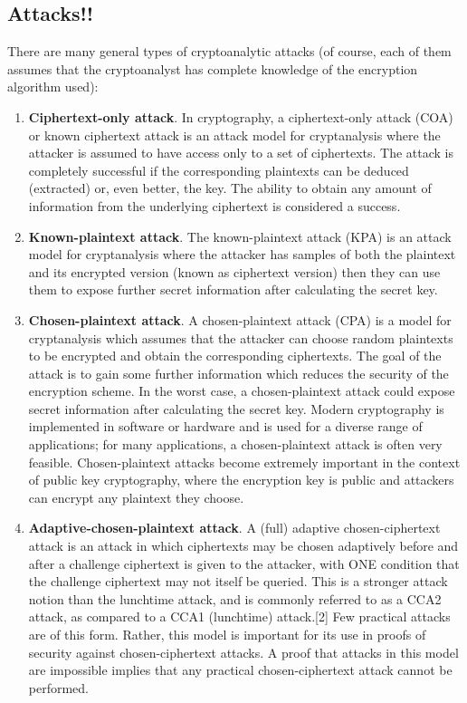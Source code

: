 \documentclass{article}
\begin{document}
\subsection{Attacks!!}
There are many general types of cryptoanalytic attacks (of course, each of them assumes that the cryptoanalyst has complete knowledge of the encryption algorithm used):
\begin{enumerate}
    \item \textbf{Ciphertext-only attack}. In cryptography, a ciphertext-only attack (COA) or known ciphertext attack is an attack model for cryptanalysis where the attacker is assumed to have access only to a set of ciphertexts.
    The attack is completely successful if the corresponding plaintexts can be deduced (extracted) or, even better, the key. The ability to obtain any amount of information from the underlying ciphertext is considered a success.
    \item \textbf{Known-plaintext attack}. The known-plaintext attack (KPA) is an attack model for cryptanalysis where the attacker has samples of both the plaintext and its encrypted version (known as ciphertext version) then they can use them to expose further secret information after calculating the secret key.
    \item \textbf{Chosen-plaintext attack}. A chosen-plaintext attack (CPA) is a model for cryptanalysis which assumes that the attacker can choose random plaintexts to be encrypted and obtain the corresponding ciphertexts. The goal of the attack is to gain some further information which reduces the security of the encryption scheme. In the worst case, a chosen-plaintext attack could expose secret information after calculating the secret key.
    Modern cryptography is implemented in software or hardware and is used for a diverse range of applications; for many applications, a chosen-plaintext attack is often very feasible. Chosen-plaintext attacks become extremely important in the context of public key cryptography, where the encryption key is public and attackers can encrypt any plaintext they choose.
    \item \textbf{Adaptive-chosen-plaintext attack}. A (full) adaptive chosen-ciphertext attack is an attack in which ciphertexts may be chosen adaptively before and after a challenge ciphertext is given to the attacker, with ONE condition that the challenge ciphertext may not itself be queried. This is a stronger attack notion than the lunchtime attack, and is commonly referred to as a CCA2 attack, as compared to a CCA1 (lunchtime) attack.[2] Few practical attacks are of this form. Rather, this model is important for its use in proofs of security against chosen-ciphertext attacks. A proof that attacks in this model are impossible implies that any practical chosen-ciphertext attack cannot be performed.

\end{enumerate}
\end{document}
